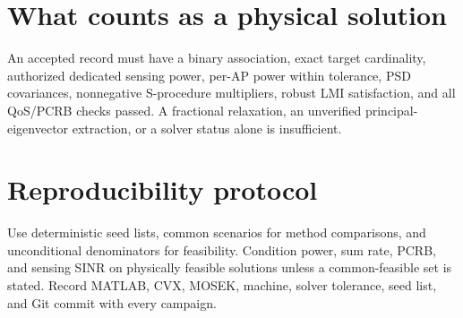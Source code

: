 \section{What counts as a physical solution}
An accepted record must have a binary association, exact target cardinality,
authorized dedicated sensing power, per-AP power within tolerance, PSD
covariances, nonnegative S-procedure multipliers, robust LMI satisfaction, and
all QoS/PCRB checks passed. A fractional relaxation, an unverified
principal-eigenvector extraction, or a solver status alone is insufficient.

\section{Reproducibility protocol}
Use deterministic seed lists, common scenarios for method comparisons, and
unconditional denominators for feasibility. Condition power, sum rate, PCRB,
and sensing SINR on physically feasible solutions unless a common-feasible set
is stated. Record MATLAB, CVX, MOSEK, machine, solver tolerance, seed list, and
Git commit with every campaign.

